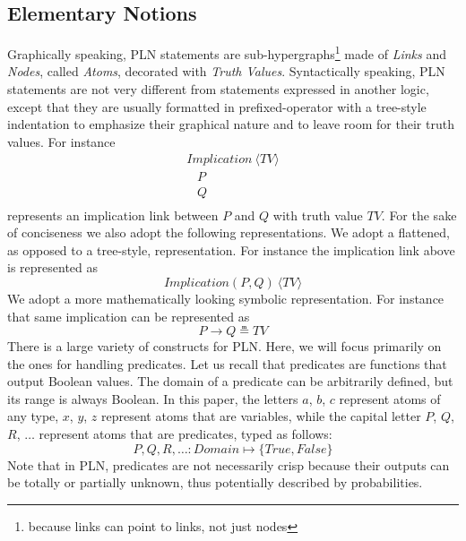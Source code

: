 \documentclass[runningheads]{llncs}
\newcommand{\SP}{\;\;\;}
\newcommand{\TTrue}{\textit{True}}
\newcommand{\TFalse}{\textit{False}}
\newcommand{\TAtom}{\textit{Atom}}
\newcommand{\TImpl}{\textit{Implication}}
\newcommand{\TTV}{\textit{TV}}
\newcommand{\TBTV}{\langle \TTV \rangle}
\newcommand{\limp}{\rightarrow}
\begin{document}
\subsection{Elementary Notions}


%
%
%


Graphically speaking, PLN statements are
sub-hypergraphs\footnote{because links can point to links, not just
  nodes} made of \emph{Links} and \emph{Nodes}, called \emph{Atoms},
decorated with \emph{Truth Values}.  Syntactically speaking, PLN
statements are not very different from statements expressed in another
logic, except that they are usually formatted in prefixed-operator
with a tree-style indentation to emphasize their graphical nature and
to leave room for their truth values.  For instance
$$
\begin{array}{l}
  \TImpl\ \TBTV\\
  \SP P\\
  \SP Q\\
\end{array}
$$
represents an implication link between $P$ and $Q$ with truth value
$\TTV$.  For the sake of conciseness we also adopt the following
representations.  We adopt a flattened, as opposed to a tree-style,
representation.  For instance the implication link above is
represented as
$$\TImpl(P, Q)\ \TBTV$$
We adopt a more mathematically looking symbolic representation.  For
instance that same implication can be represented as
$$P \limp Q \measeq \TTV$$
There is a large variety of constructs for PLN.  Here, we will focus
primarily on the ones for handling predicates.  Let us recall that
predicates are functions that output Boolean values.  The domain of a
predicate can be arbitrarily defined, but its range is always Boolean.
In this paper, the letters $a$, $b$, $c$ represent atoms of
any type, $x$, $y$, $z$ represent atoms that are variables, while the
capital letter $P$, $Q$, $R$, $\dots$ represent atoms that are
predicates, typed as follows:
$$P, Q, R, \hdots: \textit{Domain} \mapsto \{\TTrue, \TFalse\}$$
Note that in PLN, predicates are not necessarily crisp because their
outputs can be totally or partially unknown, thus potentially
described by probabilities.
\end{document}
